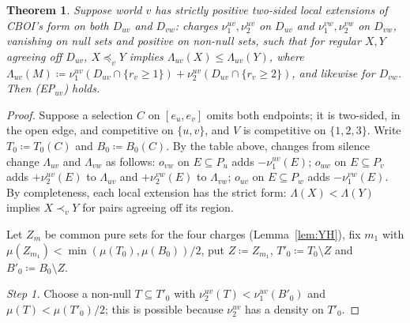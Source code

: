 \documentclass[11pt]{article}
\newtheorem{theorem}{Theorem}
\theoremstyle{definition}\newtheorem{definition}[theorem]{Definition}
\theoremstyle{remark}\newtheorem{remark}[theorem]{Remark}
\begin{document}
\begin{theorem}\label{thm:chainEP}
Suppose world $v$ has strictly positive two-sided local extensions of
CBOI's form on both $D_{uv}$ and $D_{vw}$: charges $\nu^{uv}_1,\nu^{uv}_2$ on
$D_{uv}$ and $\nu^{vw}_1,\nu^{vw}_2$ on $D_{vw}$, vanishing on null sets
and positive on non-null sets,
such that for regular $X,Y$ agreeing off $D_{uv}$, $X\preceq_vY$ implies
$\Lambda_{uv}(X)\le\Lambda_{uv}(Y)$, where
$\Lambda_{uv}(M)\coloneqq\nu^{uv}_1(D_{uv}\cap\{r_v\ge1\})
+\nu^{uv}_2(D_{uv}\cap\{r_v\ge2\})$, and likewise for $D_{vw}$. Then
(EP$_{uv}$) holds.
\end{theorem}
\begin{proof}
Suppose a selection $C$ on $[e_u,e_v]$ omits both endpoints; it is two-sided,
in the open edge, and competitive on $\{u,v\}$, and $V$ is competitive on
$\{1,2,3\}$. Write $T_0\coloneqq T_0(C)$ and $B_0\coloneqq B_0(C)$. By the
table above, changes from silence change $\Lambda_{uv}$ and $\Lambda_{vw}$ as
follows: $o_{vw}$ on $E\subseteq P_u$ adds $-\nu^{uv}_1(E)$; $o_{uw}$ on
$E\subseteq P_v$ adds $+\nu^{uv}_2(E)$ to $\Lambda_{uv}$ and $+\nu^{vw}_2(E)$ to
$\Lambda_{vw}$; $o_{uv}$ on $E\subseteq P_w$ adds $-\nu^{vw}_1(E)$. By
completeness, each local extension has the strict form: $\Lambda(X)<\Lambda(Y)$
implies $X\prec_vY$ for pairs agreeing off its region.

Let $Z_m$ be common pure sets for the four charges (Lemma~\ref{lem:YH}), fix
$m_1$ with $\mu(Z_{m_1})<\min(\mu(T_0),\mu(B_0))/2$, put $Z\coloneqq Z_{m_1}$,
$T'_0\coloneqq T_0\setminus Z$ and $B'_0\coloneqq B_0\setminus Z$.

\emph{Step 1.} Choose a non-null $T\subseteq T'_0$ with
$\nu^{uv}_2(T)<\nu^{uv}_1(B'_0)$ and $\mu(T)<\mu(T'_0)/2$; this is possible
because $\nu^{uv}_2$ has a density on $T'_0$.


\end{proof}
\end{document}
